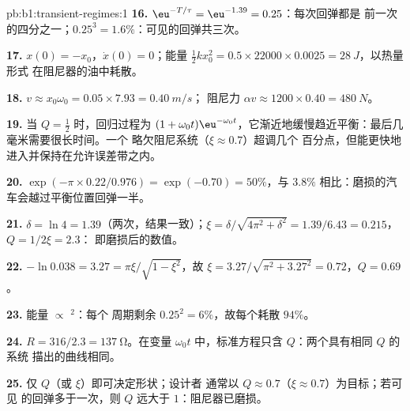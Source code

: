 \begin{solution}{pb:b1:transient-regimes:1}
\textbf{16.} $\eu^{-T/\tau} = \eu^{-1.39} = 0.25$：每次回弹都是
前一次的四分之一；$0.25^3 = 1.6\%$：可见的回弹共三次。

\textbf{17.} $x(0) = -x_0$，$\dot x(0) = 0$；能量 $\tfrac12 kx_0^2 =
0.5 \times 22000 \times 0.0025 = \qty{28}{J}$，以热量形式
在阻尼器的油中耗散。

\textbf{18.} $v \approx x_0\omega_0 = 0.05 \times 7.93 = \qty{0.40}{m/s}$；
阻尼力 $\alpha v \approx 1200 \times 0.40 = \qty{480}{N}$。

\textbf{19.} 当 $Q = \tfrac12$ 时，回归过程为 $(1 + \omega_0 t)\eu^{-\omega_0
t}$，它渐近地缓慢趋近平衡：最后几毫米需要很长时间。一个
略欠阻尼系统（$\xi \approx 0.7$）超调几个
百分点，但能更快地进入并保持在允许误差带之内。

\textbf{20.} $\exp(-\pi \times 0.22/0.976) = \exp(-0.70) = 50\%$，与
$3.8\%$ 相比：磨损的汽车会越过平衡位置回弹一半。

\textbf{21.} $\delta = \ln 4 = 1.39$（两次，结果一致）；$\xi =
\delta/\sqrt{4\pi^2 + \delta^2} = 1.39/6.43 = 0.215$，$Q = 1/2\xi = 2.3$：
即磨损后的数值。

\textbf{22.} $-\ln 0.038 = 3.27 = \pi\xi/\sqrt{1 - \xi^2}$，故 $\xi =
3.27/\sqrt{\pi^2 + 3.27^2} = 0.72$，$Q = 0.69$。

\textbf{23.} 能量 $\propto$ $^2$：每个
周期剩余 $0.25^2 = 6\%$，故每个耗散 $94\%$。

\textbf{24.} $R = 316/2.3 = \qty{137}{\ohm}$。在变量 $\omega_0 t$
中，标准方程只含 $Q$：两个具有相同 $Q$ 的系统
描出的曲线相同。

\textbf{25.} 仅 $Q$（或 $\xi$）即可决定形状；设计者
通常以 $Q \approx 0.7$（$\xi \approx 0.7$）为目标；若可见
的回弹多于一次，则 $Q$ 远大于 $1$：阻尼器已磨损。
\end{solution}
